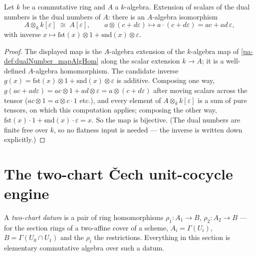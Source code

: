 \begin{theorem}
  \label{pa-thm:dualNumber_baseChange}
  \leanok

  Let \(k\) be a commutative ring and \(A\) a \(k\)-algebra. Extension of scalars of
  the dual numbers is the dual numbers of \(A\): there is an \(A\)-algebra isomorphism
  \[
    A \otimes_k k[\varepsilon] \;\cong\; A[\varepsilon], \qquad
    a \otimes (c + d\varepsilon) \longmapsto a \cdot (c + d\varepsilon)
      = ac + ad\,\varepsilon,
  \]
  with inverse \(x \mapsto \mathrm{fst}(x) \otimes 1 + \mathrm{snd}(x) \otimes
  \varepsilon\).
\end{theorem}
\begin{proof}
  \leanok
  The displayed map is the \(A\)-algebra extension of the \(k\)-algebra map of
  \ref{pa-def:dualNumber_mapAlgHom} along the scalar extension \(k \to A\); it is a
  well-defined \(A\)-algebra homomorphism. The candidate inverse
  \(g(x) = \mathrm{fst}(x) \otimes 1 + \mathrm{snd}(x) \otimes \varepsilon\) is
  additive. Composing one way,
  \(g(ac + ad\varepsilon) = ac \otimes 1 + ad \otimes \varepsilon =
  a \otimes (c + d\varepsilon)\) after moving scalars across the tensor
  (\(ac \otimes 1 = a \otimes c\cdot 1\) etc.), and every element of
  \(A \otimes_k k[\varepsilon]\) is a sum of pure tensors, on which this computation
  applies; composing the other way,
  \(\mathrm{fst}(x)\cdot 1 + \mathrm{snd}(x)\cdot\varepsilon = x\). So the map is
  bijective. (The dual numbers are finite free over \(k\), so no flatness input is
  needed --- the inverse is written down explicitly.)
\end{proof}

\section{The two-chart \v{C}ech unit-cocycle engine}

A \emph{two-chart datum} is a pair of ring homomorphisms \(\rho_1 : A_1 \to B\),
\(\rho_2 : A_2 \to B\) --- for the section rings of a two-affine cover of a scheme,
\(A_i = \Gamma(U_i)\), \(B = \Gamma(U_0 \cap U_1)\) and the \(\rho_i\) the restrictions.
Everything in this section is elementary commutative algebra over such a datum.

